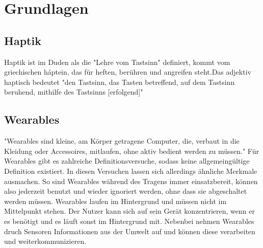 \documentclass[ngerman,runningheads,a4paper]{llncs}
\begin{document}
\section{Grundlagen}
\subsection{Haptik}
Haptik ist im Duden als die "Lehre vom Tastsinn"\cite{Haptik} definiert, kommt vom griechischen h\'{a}ptein, das für heften, berühren und angreifen steht.Das adjektiv haptisch bedeutet "den Tastsinn, das Tasten betreffend, auf dem Tastsinn beruhend, mithilfe des Tastsinns [erfolgend]"\cite{haptisch}

\subsection{Wearables}
"Wearables sind kleine, am Körper getragene Computer, die, verbaut in die Kleidung oder Accessoires, mitlaufen, ohne aktiv bedient werden zu müssen." \cite{kleine2016gesellschaftliche}
Für Wearables gibt es zahlreiche Definitionsversuche, sodass keine allgemeingültige Definition existiert. In diesen Versuchen lassen sich allerdings ähnliche Merkmale ausmachen. So sind Wearables während des Tragens immer einsatzbereit, können also jederzeit benutzt und wieder ignoriert werden, ohne dass sie abgeschaltet werden müssen. Wearables laufen im Hintergrund und müssen nicht im Mittelpunkt stehen. Der Nutzer kann sich auf sein Gerät konzentrieren, wenn er es benötigt und es läuft sonst im Hintergrund mit. Nebenbei nehmen Wearables druch Sensoren Informationen aus der Umwelt auf und können diese verarbeiten und weiterkommunizieren.
\end{document}
